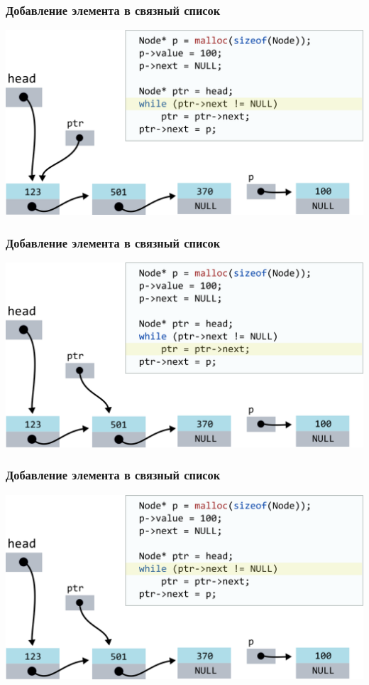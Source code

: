 \documentclass[10pt,pdf,hyperref={unicode}]{beamer}
\begin{document}
\begin{frame}[fragile]
\frametitle{Добавление элемента в связный список}
\begin{center}
\includegraphics[scale=0.6]{images/list/codelistf_insert6.png}
\end{center}
\end{frame}


\begin{frame}[fragile]
\frametitle{Добавление элемента в связный список}
\begin{center}
\includegraphics[scale=0.6]{images/list/codelistf_insert7.png}
\end{center}
\end{frame}


\begin{frame}[fragile]
\frametitle{Добавление элемента в связный список}
\begin{center}
\includegraphics[scale=0.6]{images/list/codelistf_insert8.png}
\end{center}
\end{frame}
\end{document}

